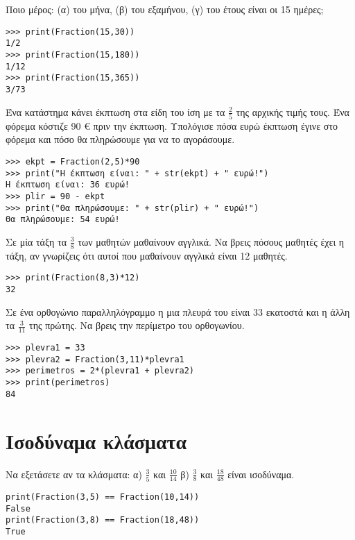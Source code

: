\begin{exercise}
Ποιο μέρος: (α) του μήνα, (β) του εξαμήνου, (γ) του έτους είναι οι 15 ημέρες;
\end{exercise}

\begin{lstlisting}
>>> print(Fraction(15,30))
1/2
>>> print(Fraction(15,180))
1/12
>>> print(Fraction(15,365))
3/73
\end{lstlisting}

\begin{exercise}
Ένα κατάστημα κάνει έκπτωση στα είδη του ίση με τα $\frac{2}{5}$ της αρχικής τιμής τους. Ένα φόρεμα κόστιζε 90 € πριν την έκπτωση. Υπολόγισε πόσα ευρώ έκπτωση έγινε στο φόρεμα και πόσο θα πληρώσουμε για να το αγοράσουμε.
\end{exercise}
\begin{lstlisting}
>>> ekpt = Fraction(2,5)*90
>>> print("Η έκπτωση είναι: " + str(ekpt) + " ευρώ!")
Η έκπτωση είναι: 36 ευρώ!
>>> plir = 90 - ekpt
>>> print("Θα πληρώσουμε: " + str(plir) + " ευρώ!")
Θα πληρώσουμε: 54 ευρώ!
\end{lstlisting}

\begin{exercise}
Σε μία τάξη τα $\frac{3}{8}$ των μαθητών μαθαίνουν αγγλικά. Να βρεις πόσους μαθητές έχει η τάξη, αν γνωρίζεις ότι αυτοί που μαθαίνουν αγγλικά είναι 12 μαθητές.
\end{exercise}

\begin{lstlisting}
>>> print(Fraction(8,3)*12)
32
\end{lstlisting}

\begin{exercise}
Σε ένα ορθογώνιο παραλληλόγραμμο η μια πλευρά του είναι 33 εκατοστά και η άλλη τα $\frac{3}{11}$ της πρώτης. Να βρεις την περίμετρο του ορθογωνίου.
\end{exercise}

\begin{lstlisting}
>>> plevra1 = 33
>>> plevra2 = Fraction(3,11)*plevra1
>>> perimetros = 2*(plevra1 + plevra2)
>>> print(perimetros)
84
\end{lstlisting}

\section{Ισοδύναμα κλάσματα}

\begin{exercise}
Να εξετάσετε αν τα κλάσματα: α) $\frac{3}{5}$ και $\frac{10}{14}$ β) $\frac{3}{8}$ και $\frac{18}{48}$ είναι ισοδύναμα.
\end{exercise}
\begin{lstlisting}
print(Fraction(3,5) == Fraction(10,14))
False
print(Fraction(3,8) == Fraction(18,48))
True
\end{lstlisting}

